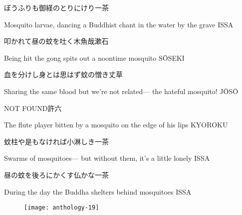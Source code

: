 \begin{haiku}
    {\FH ぼうふりも御経のとりにけり}\hfill{\FH 一茶}

    \vin{} Mosquito larvae,
    \vin{} \vin{} dancing a Buddhist chant
    \vin{} \vin{} \vin{} in the water by the grave \hspace{\fill} ISSA
\end{haiku}

\begin{haiku}
    {\FH 叩かれて昼の蚊を吐く木魚哉}\hfill{\FH 漱石}

    \vin{} Being hit
    \vin{} \vin{} the gong spits out
    \vin{} \vin{} \vin{} a noontime mosquito \hspace{\fill} S\={O}SEKI
\end{haiku}

\begin{haiku}
    {\FH 血を分けし身とは思はず蚊の憎き}\hfill{\FH 丈草}

    \vin{} Sharing the same blood
    \vin{} \vin{} but we're not related---
    \vin{} \vin{} \vin{} the hateful mosquito! \hspace{\fill} J\={O}S\={O}
\end{haiku}

\begin{haiku}
    NOT FOUND\hfill{\FH 許六}

    \vin{} The flute player
    \vin{} \vin{} bitten by a mosquito
    \vin{} \vin{} \vin{} on the edge of his lips \hspace{\fill} KYOROKU
\end{haiku}

\begin{haiku}
    {\FH 蚊柱や是もなければ小淋しき}\hfill{\FH 一茶}

    \vin{} Swarms of mosquitoes---
    \vin{} \vin{} but without them,
    \vin{} \vin{} \vin{} it's a little lonely \hspace{\fill} ISSA
\end{haiku}

\begin{haiku}
    {\FH 昼の蚊を後ろにかくす仏かな}\hfill{\FH 一茶}

    \vin{} During the day
    \vin{} \vin{} the Buddha shelters behind
    \vin{} \vin{} \vin{} mosquitoes \hspace{\fill} ISSA
\end{haiku}

\begin{figure}
    \texttt{[image: anthology-19]}
\end{figure}

